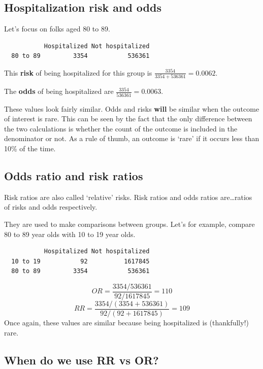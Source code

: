 \documentclass[
  openany]{book}
\begin{document}
\hypertarget{hospitalization-risk-and-odds}{%
\subsection{Hospitalization risk and odds}\label{hospitalization-risk-and-odds}}

Let's focus on folks aged 80 to 89.

\begin{verbatim}
           Hospitalized Not hospitalized
  80 to 89         3354           536361
\end{verbatim}

This \textbf{risk} of being hospitalized for this group is
\(\frac{3354}{3354+536361} = 0.0062\).

The \textbf{odds} of being hospitalized are \(\frac{3354}{536361} = 0.0063\).

These values look fairly similar. Odds and risks \textbf{will} be similar
when the outcome of interest is rare. This can be seen by the fact that
the only difference between the two calculations is whether the count of
the outcome is included in the denominator or not. As a rule of thumb,
an outcome is `rare' if it occurs less than 10\% of the time.

\hypertarget{odds-ratio-and-risk-ratios}{%
\subsection{Odds ratio and risk ratios}\label{odds-ratio-and-risk-ratios}}

Risk ratios are also called `relative' risks. Risk ratios and odds
ratios are\ldots ratios of risks and odds respectively.

They are used to make comparisons between groups. Let's for example,
compare 80 to 89 year olds with 10 to 19 year olds.

\begin{verbatim}
           Hospitalized Not hospitalized
  10 to 19           92          1617845
  80 to 89         3354           536361
\end{verbatim}

\[OR = \frac{3354/536361}{92/1617845} = 110\]
\[RR = \frac{3354/(3354+536361)}{92/(92+1617845)} = 109\] Once again,
these values are similar because being hospitalized is (thankfully!)
rare.

\hypertarget{when-do-we-use-rr-vs-or}{%
\subsection{When do we use RR vs OR?}\label{when-do-we-use-rr-vs-or}}
\end{document}
